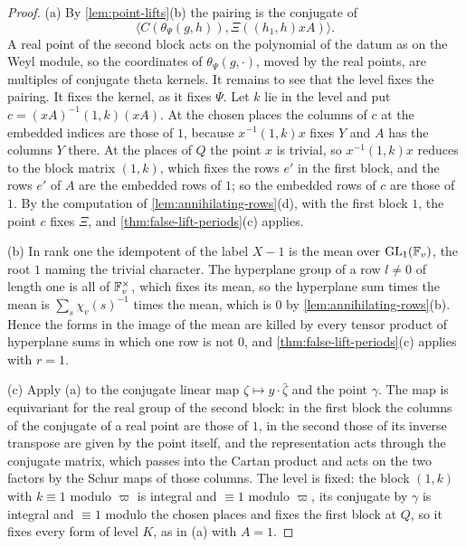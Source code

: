 \begin{proof}
(a) By \cref{lem:point-lifts}(b) the pairing is the conjugate of
\[
  \langle C(\theta_\Psi(g,h)),\Xi((h_1,h)xA)\rangle.
\]
A real point of the second block acts on the polynomial of the datum as on the Weyl module, so the coordinates of
$\theta_\Psi(g,\cdot)$, moved by the real points, are multiples of conjugate theta kernels. It remains to see that the level fixes the pairing. It fixes the kernel, as it fixes $\Psi$. Let $k$ lie in the level and put
$c=(xA)^{-1}(1,k)(xA)$. At the chosen places the columns of $c$ at the embedded indices are those of $1$, because $x^{-1}(1,k)x$ fixes $Y$ and $A$ has the columns $Y$ there. At the places of $Q$ the point $x$ is trivial, so
$x^{-1}(1,k)x$ reduces to the block matrix $(1,k)$, which fixes the rows $e'$ in the first block, and the rows $e'$ of $A$ are the embedded rows of $1$; so the embedded rows of $c$ are those of $1$. By the computation of
\cref{lem:annihilating-rows}(d), with the first block $1$, the point $c$ fixes $\Xi$, and \cref{thm:false-lift-periods}(c) applies.

(b) In rank one the idempotent of the label $X-1$ is the mean over $\operatorname{GL}_1(\mathbb{F}_v)$, the root $1$ naming the trivial character. The hyperplane group of a row $l\ne0$ of length one is all of $\mathbb{F}_v^\times$, which fixes its mean,
so the hyperplane sum times the mean is $\sum_s\chi_v(s)^{-1}$ times the mean, which is $0$ by \cref{lem:annihilating-rows}(b). Hence the forms in the image of the mean are killed by every tensor product of hyperplane
sums in which one row is not $0$, and \cref{thm:false-lift-periods}(c) applies with $r=1$.

(c) Apply (a) to the conjugate linear map $\zeta\mapsto y\cdot\bar\zeta$ and the point $\gamma$. The map is equivariant for the real group of the second block: in the first block the columns of the conjugate of a real point
are those of $1$, in the second those of its inverse transpose are given by the point itself, and the representation acts through the conjugate matrix, which passes into the Cartan product and acts on the two
factors by the Schur maps of those columns. The level is fixed: the block $(1,k)$ with $k\equiv1$ modulo $\varpi$ is integral and $\equiv1$ modulo $\varpi$, its conjugate by $\gamma$ is integral and $\equiv1$ modulo the
chosen places and fixes the first block at $Q$, so it fixes every form of level $K$, as in (a) with $A=1$.
\end{proof}

